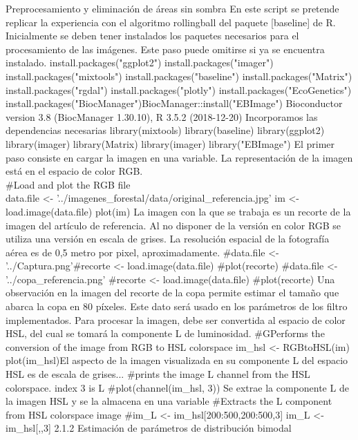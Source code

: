 Preprocesamiento y eliminación de áreas sin sombra
En este script se pretende replicar la experiencia con el algoritmo rollingball del paquete
[baseline] de R.
Inicialmente se deben tener instalados los paquetes necesarios para el procesamiento de las imágenes.
Este paso puede omitirse si ya se encuentra instalado.
install.packages("ggplot2")
install.packages("imager")
install.packages("mixtools")
install.packages("baseline")
install.packages("Matrix")
install.packages("rgdal")
install.packages("plotly")
install.packages("EcoGenetics")
install.packages("BiocManager")BiocManager::install("EBImage")
Bioconductor version 3.8 (BiocManager 1.30.10), R 3.5.2 (2018-12-20)
Incorporamos las dependencias necesarias
library(mixtools)
library(baseline)
library(ggplot2)
library(imager)
library(Matrix)
library(imager)
library("EBImage")
El primer paso consiste en cargar la imagen en una variable. La representación de la
imagen está en el espacio de color RGB.\\
\#Load and plot the RGB file\\
data.file <- '../imagenes_forestal/data/original_referencia.jpg'
im <- load.image(data.file)
plot(im)
La imagen con la que se trabaja es un recorte de la imagen del artículo de referencia. Al
no disponer de la versión en color RGB se utiliza  una versión en escala de grises.
La resolución espacial de la fotografía aérea es de 0,5 metro por pixel,
aproximadamente.
#data.file <- '../Captura.png'#recorte <- load.image(data.file)
#plot(recorte)
#data.file <- '../copa_referencia.png'
#recorte <- load.image(data.file)
#plot(recorte)
Una observación en la imagen del recorte de la copa permite estimar el tamaño que
abarca la copa en 80 píxeles. Este dato será usado en los parámetros de los filtro
implementados.
Para procesar la imagen, debe ser convertida al espacio de color  HSL, del cual se
tomará la componente L de luminosidad.
#GPerforms the conversion of the image from RGB to HSL colorspace
im_hsl <- RGBtoHSL(im)
plot(im_hsl)El aspecto de la imagen visualizada en su componente L del espacio HSL es de escala
de grises...
#prints the image L channel from the HSL colorspace. index 3 is L
#plot(channel(im_hsl, 3))
Se extrae la componente L de la imagen HSL y se la almacena en una variable
#Extracts the L component from HSL colorspace image
#im_L <- im_hsl[200:500,200:500,3]
im_L <- im_hsl[,,3]
2.1.2 Estimación de parámetros de distribución bimodal
